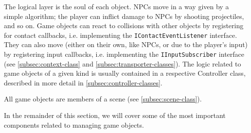 The logical layer is the soul of each object.
NPCs move in a way given by a simple algorithm;
the player can inflict damage to NPCs by shooting projectiles, and so on.
Game objects can react to collisions with other objects by registering for contact callbacks, i.e. implementing the \texttt{IContactEventListener} interface.
They can also move (either on their own, like NPCs, or due to the player's input) by registering input callbacks, i.e. implementing the \texttt{IInputSubscriber} interface (see \autoref{subsec:context-class} and \autoref{subsec:transporter-classes}).
The logic related to game objects of a given kind is usually contained in a respective Controller class, described in more detail in \autoref{subsec:controller-classes}.

All game objects are members of a scene (see \autoref{subsec:scene-class}).

In the remainder of this section, we will cover some of the most important components related to managing game objects.






